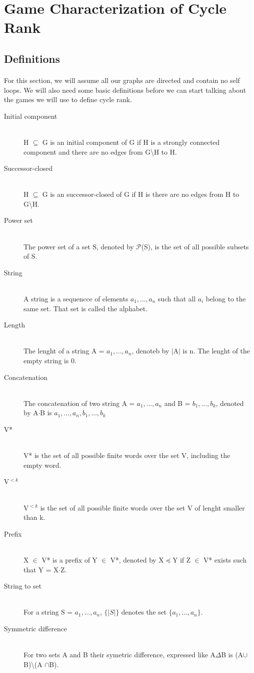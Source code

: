 \section{Game Characterization of Cycle Rank}

\subsection{Definitions}
\paragraph{}
For this section, we will assume all our graphs are directed and contain no self loops. We will also need some basic definitions before we can start talking about the games we will use to define cycle rank.
\begin{description}
 \item[Initial component] \hfill \\
H $\subseteq$ G is an initial component of G if H is a strongly connected component and there are no edges from G\textbackslash H to H.
 \item[Successor-closed] \hfill \\
H $\subseteq$ G is an successor-closed of G if H is there are no edges from H to G\textbackslash H.
\item[Power set] \hfill \\
The power set of a set S, denoted by $\mathcal{P}$(S), is the set of all possible subsets of S.
\item[String] \hfill \\
A string is a sequencce of elements $a_1, \ldots, a_n$ such that all $a_i$ belong to the same set. That set is called the alphabet.
\item[Length] \hfill \\
The lenght of a string  A = $a_1, \ldots, a_n$, denoteb by $|$A$|$ is n. The lenght of the empty string is 0.
\item[Concatenation] \hfill \\
The concatenation of two string A =  $a_1, \ldots, a_n$ and B =  $b_1, \ldots, b_k$, denoted by A$\cdot$B is $a_1, \ldots, a_n,b_1, \ldots, b_k$
\item[V*] \hfill \\
V* is the set of all possible finite words over the set V, including the empty word.
\item[V$^{<k}$] \hfill \\
V$^{<k}$ is the set of all possible finite words over the set V of lenght smaller than k.
\item[Prefix] \hfill \\
X $\in$ V* is a prefix of Y $\in$ V*, denoted by X$\preceq$Y  if Z $\in$ V* exists such that Y = X$\cdot$Z.
\item[String to set] \hfill \\
For a string S = $a_1, \ldots, a_n$, $\{|S|\}$ denotes the set $\{a_1, \ldots, a_n\}$.
\item[Symmetric difference] \hfill \\
For two sets A and B their symetric difference, expressed like A$\Delta$B is (A$\cup$B)\textbackslash (A $\cap$B).
\end{description}

